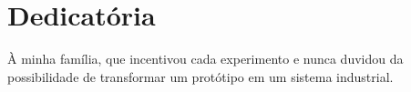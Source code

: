 \chapter*{Dedicatória}
\vspace{2cm}
\begin{flushright}
    À minha família, que incentivou cada experimento e nunca duvidou da
    possibilidade de transformar um protótipo em um sistema industrial.
\end{flushright}
